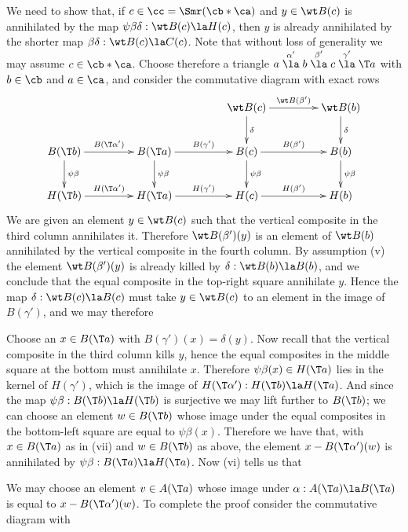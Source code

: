 \documentclass[11pt]{amsart}
\begin{document}
\prf
We need to show that, if $c\in\cc=\Smr(\cb*\ca)$ and $y\in\wt B(c)$
is annihilated by the map $\psi\beta\delta:\wt B(c)\la H(c)$, then
$y$ is already annihilated by the shorter map $\beta\delta:\wt B(c)\la C(c)$.
Note that without loss of generality we may assume $c\in\cb*\ca$. Choose
therefore a triangle
$a\stackrel{\alpha'}\la b\stackrel{\beta'}\la c\stackrel{\gamma'}\la \T a$
with $b\in\cb$ and $a\in\ca$, and consider the commutative diagram with
exact rows
\[\xymatrix@C+20pt{
 & & \wt B(c)\ar[d]^-{\delta}\ar[r]^-{\wt B(\beta')} &
\wt B(b)\ar[d]^-{\delta} \\
B(\T b)\ar[d]^-{\psi\beta}\ar[r]^-{B(\T\alpha')}  &
B(\T a)\ar[d]^-{\psi\beta}\ar[r]^-{B(\gamma')}  &
 B(c)\ar[d]^-{\psi\beta}\ar[r]^-{B(\beta')} &
B(b)\ar[d]^-{\psi\beta} \\
H(\T b)\ar[r]^-{H(\T\alpha')} &H(\T a)\ar[r]^-{H(\gamma')} &  H(c)\ar[r]^-{H(\beta')} & H(b)
}\]
We are given an element $y\in\wt B(c)$ such that the vertical composite
in the third column annihilates it. Therefore $\wt B(\beta')(y)$ is an
element of $\wt B(b)$ annihilated by the vertical composite in
the fourth column. By assumption (v) the element $\wt B(\beta')(y)$ is already
killed by $\delta:\wt B(b)\la B(b)$, and we conclude that the equal
composite in the top-right square annihilate $y$. Hence
the map $\delta:\wt B(c)\la B(c)$ must take $y\in\wt B(c)$ to an element
in the image of $B(\gamma')$, and we may therefore
\be
\setcounter{enumi}{\value{enumiv}}
\item
Choose an $x\in B(\T a)$ with
$B(\gamma')(x)=\delta(y)$.
\setcounter{enumiv}{\value{enumi}}
\ee
Now recall that the vertical composite in the third column kills $y$,
hence the equal composites in the middle square at the bottom must annihilate
$x$. Therefore $\psi\beta(x)\in H(\T a)$ lies in the kernel of $H(\gamma')$,
which is the image of $H(\T\alpha'):H(\T b)\la H(\T a)$. And since
the map $\psi\beta:B(\T b)\la H(\T b)$ is surjective we may
lift further to $B(\T b)$; we can choose an element $w\in B(\T b)$ whose
image under the equal composites in the bottom-left square are equal to
$\psi\beta(x)$. Therefore we have that,
with $x\in B(\T a)$ as in (vii) and $w\in B(\T b)$ as above, the element
$x-B(\T \alpha')(w)$ is annihilated by $\psi\beta:B(\T a)\la H(\T a)$.
Now (vi) tells us that 
\be
\setcounter{enumi}{\value{enumiv}}
\item
We may choose an element $v\in A(\T a)$ whose
image under $\alpha:A(\T a)\la B(\T a)$ is equal to $x-B(\T \alpha')(w)$.
\setcounter{enumiv}{\value{enumi}}
\ee
To complete the proof consider the commutative diagram with
\end{document}
